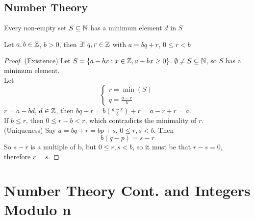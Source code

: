 \documentclass[openany]{report}
\begin{document}
\section{Number Theory}
\begin{fact}
Every non-empty set $S \subseteq \mathbb{N}$ has a minimum element $d$ in $S$
\end{fact}
\begin{prop}
Let $a,b \in \mathbb{Z}$, $b > 0$, then $\exists ! \ q,r \in \mathbb{Z}$ with $a = bq + r$, $0 \leq r < b$
\end{prop}
\begin{proof}
    (Existence) Let $S = \{a - bx: x \in \mathbb{Z}, a-bx \geq 0 \}$. 
    $\emptyset \neq S \subseteq \mathbb{N}$, so $S$ has a minimum element.\\
    Let \[\begin{cases}
        r = \min(S)\\
        q = \frac{a-r}{b}
    \end{cases}\]
    $r = a - bd$, $d \in \mathbb{Z}$, then $bq +r = b(\frac{a-r}{b}) + r = a - r + r = a$.\\[1ex]
    If $b \leq r$, then $0 \leq r - b < r$, which contradicts the minimality of $r$.\\[2ex]
    (Uniqueness) Say $a = bq + r = bp + s$, $0 \leq r,s < b$. Then
    $$b(q-p) = s - r$$
    So $s-r$ is a multiple of b, but $0 \leq r,s < b$, so it must be that $r - s = 0$, therefore $r = s$.
\end{proof}

\chapter{Number Theory Cont. and Integers Modulo n}
\end{document}
